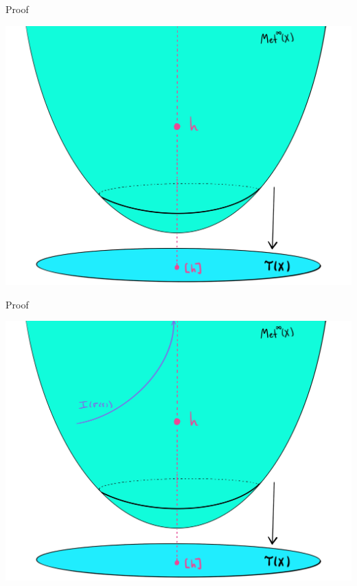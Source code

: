\documentclass[professionalfont]{beamer}
\begin{document}


\begin{frame}{Proof}

\centering\includegraphics[scale=0.09]{Teich-2.jpg}

\end{frame}




\begin{frame}{Proof}

\centering\includegraphics[scale=0.09]{Teich-3.jpg}

\end{frame}


\end{document}
